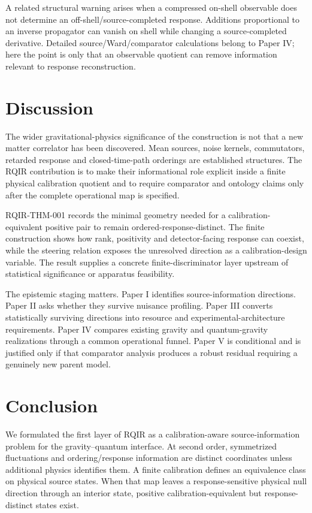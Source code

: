 \documentclass[12pt]{article}
\begin{document}
A related structural warning arises when a compressed on-shell observable does not determine an off-shell/source-completed response. Additions proportional to an inverse propagator can vanish on shell while changing a source-completed derivative. Detailed source/Ward/comparator calculations belong to Paper IV; here the point is only that an observable quotient can remove information relevant to response reconstruction.

\section{Discussion}

The wider gravitational-physics significance of the construction is not that a new matter correlator has been discovered. Mean sources, noise kernels, commutators, retarded response and closed-time-path orderings are established structures. The RQIR contribution is to make their informational role explicit inside a finite physical calibration quotient and to require comparator and ontology claims only after the complete operational map is specified.

RQIR-THM-001 records the minimal geometry needed for a calibration-equivalent positive pair to remain ordered-response-distinct. The finite construction shows how rank, positivity and detector-facing response can coexist, while the steering relation exposes the unresolved direction as a calibration-design variable. The result supplies a concrete finite-discriminator layer upstream of statistical significance or apparatus feasibility.

The epistemic staging matters. Paper I identifies source-information directions. Paper II asks whether they survive nuisance profiling. Paper III converts statistically surviving directions into resource and experimental-architecture requirements. Paper IV compares existing gravity and quantum-gravity realizations through a common operational funnel. Paper V is conditional and is justified only if that comparator analysis produces a robust residual requiring a genuinely new parent model.

\section{Conclusion}

We formulated the first layer of RQIR as a calibration-aware source-information problem for the gravity--quantum interface. At second order, symmetrized fluctuations and ordering/response information are distinct coordinates unless additional physics identifies them. A finite calibration defines an equivalence class on physical source states. When that map leaves a response-sensitive physical null direction through an interior state, positive calibration-equivalent but response-distinct states exist.
\end{document}
